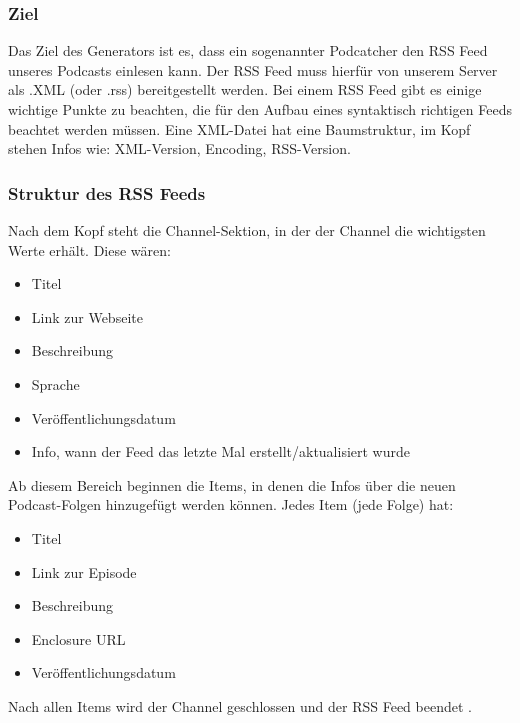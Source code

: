 \documentclass{article}
\begin{document}
\subsubsection{Ziel}
Das Ziel des Generators ist es, dass ein sogenannter Podcatcher den RSS Feed unseres Podcasts einlesen kann. Der RSS Feed muss hierfür von unserem Server als .XML (oder .rss) bereitgestellt werden. Bei einem RSS Feed gibt es einige wichtige Punkte zu beachten, die für den Aufbau eines syntaktisch richtigen Feeds beachtet werden müssen. Eine XML-Datei hat eine Baumstruktur, im Kopf stehen Infos wie: XML-Version, Encoding, RSS-Version.

\subsubsection{Struktur des RSS Feeds}
Nach dem Kopf steht die Channel-Sektion, in der der Channel die wichtigsten Werte erhält. Diese wären:
\begin{itemize}
    \item Titel
    \item Link zur Webseite
    \item Beschreibung
    \item Sprache
    \item Veröffentlichungsdatum
    \item Info, wann der Feed das letzte Mal erstellt/aktualisiert wurde
\end{itemize}

Ab diesem Bereich beginnen die Items, in denen die Infos über die neuen Podcast-Folgen hinzugefügt werden können. Jedes Item (jede Folge) hat:

\begin{itemize}
    \item Titel
    \item Link zur Episode
    \item Beschreibung
    \item Enclosure URL
    \item Veröffentlichungsdatum
\end{itemize}

Nach allen Items wird der Channel geschlossen und der RSS Feed beendet \cite{rss}.
\end{document}
